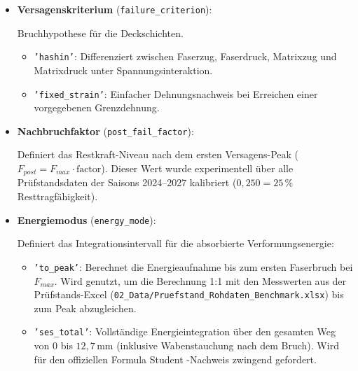 \begin{itemize}
    \item \textbf{Versagenskriterium} (\texttt{failure\_criterion}): \par
    Bruchhypothese für die Deckschichten.
    \begin{itemize}
        \item \texttt{'hashin'}: Differenziert zwischen Faserzug, Faserdruck, Matrixzug und Matrixdruck unter Spannungsinteraktion.
        \item \texttt{'fixed\_strain'}: Einfacher Dehnungsnachweis bei Erreichen einer vorgegebenen Grenzdehnung.
    \end{itemize}

    \item \textbf{Nachbruchfaktor} (\texttt{post\_fail\_factor}): \par
    Definiert das Restkraft-Niveau nach dem ersten Versagens-Peak ($F_{post} = F_{max} \cdot \text{factor}$). Dieser Wert wurde experimentell über alle Prüfstandsdaten der Saisons 2024--2027 kalibriert ($0{,}250 = 25\,\%$ Resttragfähigkeit).

    \item \textbf{Energiemodus} (\texttt{energy\_mode}): \par
    Definiert das Integrationsintervall für die absorbierte Verformungsenergie:
    \begin{itemize}
        \item \texttt{'to\_peak'}: Berechnet die Energieaufnahme bis zum ersten Faserbruch bei $F_{max}$. Wird genutzt, um die Berechnung 1:1 mit den Messwerten aus der Prüfstands-Excel (\texttt{02\_Data/\allowbreak Pruefstand\_\allowbreak Rohdaten\_\allowbreak Benchmark.xlsx}) bis zum Peak abzugleichen.
        \item \texttt{'ses\_total'}: Vollständige Energieintegration über den gesamten Weg von $0$ bis $12{,}7\,\text{mm}$ (inklusive Wabenstauchung nach dem Bruch). Wird für den offiziellen Formula Student -Nachweis zwingend gefordert.
    \end{itemize}
\end{itemize}
